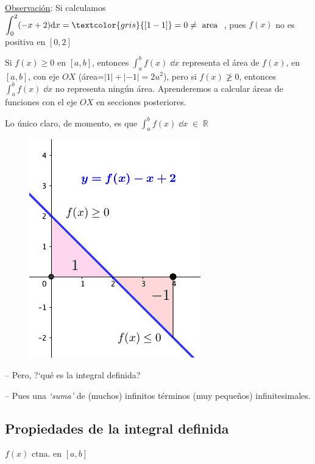 \vspace{4mm}

\underline{Observación}: Si calculamos  $\displaystyle \int_0^2 (-x+2) \dd x =\textcolor{gris}{[1-1]}=0  \neq \text { area } $ , pues $f(x)$ no es positiva en $[0,2]$

 \begin{multicols}{2}

 Si $f(x)\ge 0 $ en $[a,b]$, entonces $\displaystyle \int_a^b f(x)\; \dd x $ representa el área de $f(x)$, en $[a,b]$, con eje $OX$ (\textcolor{gris}{área=$|1|+|-1|=2u^2$}), pero si $f(x) \ngeq  0 $, entonces $\displaystyle \int_a^b f(x)\; \dd x $  no representa ningún área. Aprenderemos a calcular áreas de funciones con el eje $OX$ en secciones posteriores.
 
 Lo único claro, de momento, es que $\displaystyle \int_a^b f(x)\; \dd x \; \in \; \mathbb R $ 
	
	\begin{figure}[H]
	\centering
	\includegraphics[width=.35\textwidth]{imagenes/imagenes08/T08IM05.png}
	\end{figure}
	\end{multicols}



-- Pero, ?`qué es la integral definida?

-- Pues una \emph {`suma' } de (muchos) infinitos términos (muy pequeños) infinitesimales. 
	
\subsection{Propiedades de la integral definida} 
$f(x)$ ctna. en $[a,b]$

